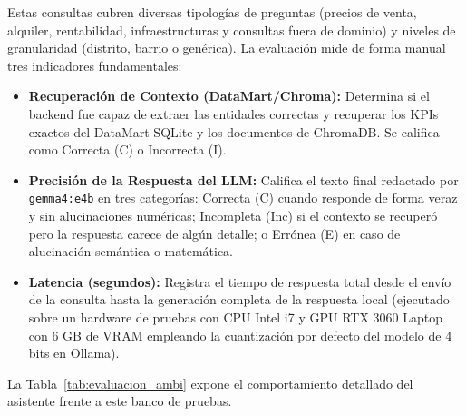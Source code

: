 \documentclass[a4paper,11pt,openany]{book}
\begin{document}
Estas consultas cubren diversas tipologías de preguntas (precios de venta, alquiler, rentabilidad, infraestructuras y consultas fuera de dominio) y niveles de granularidad (distrito, barrio o genérica). La evaluación mide de forma manual tres indicadores fundamentales:
\begin{itemize}
    \item \textbf{Recuperación de Contexto (DataMart/Chroma):} Determina si el backend fue capaz de extraer las entidades correctas y recuperar los KPIs exactos del DataMart SQLite y los documentos de ChromaDB. Se califica como Correcta (C) o Incorrecta (I).
    \item \textbf{Precisión de la Respuesta del LLM:} Califica el texto final redactado por \texttt{gemma4:e4b} en tres categorías: Correcta (C) cuando responde de forma veraz y sin alucinaciones numéricas; Incompleta (Inc) si el contexto se recuperó pero la respuesta carece de algún detalle; o Errónea (E) en caso de alucinación semántica o matemática.
    \item \textbf{Latencia (segundos):} Registra el tiempo de respuesta total desde el envío de la consulta hasta la generación completa de la respuesta local (ejecutado sobre un hardware de pruebas con CPU Intel i7 y GPU RTX 3060 Laptop con 6 GB de VRAM empleando la cuantización por defecto del modelo de 4 bits en Ollama).
\end{itemize}

La Tabla~\ref{tab:evaluacion_ambi} expone el comportamiento detallado del asistente frente a este banco de pruebas.
\end{document}

